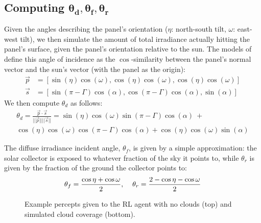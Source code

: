 \documentclass{article}
\begin{document}
\subsection{Computing $\pmb{\theta_d, \theta_f, \theta_r}$}
Given the angles describing the panel's orientation ($\eta$: north-south tilt, $\omega$: east-west tilt), we then simulate the amount of total irradiance actually hitting the panel's surface, given the panel's orientation relative to the sun. The models of~\citet{masters2013renewable} define this angle of incidence as the $\cos$-similarity between the panel's normal vector and the sun's vector (with the panel as the origin):
\begin{align*}
\vec{p} &= \left[ \sin(\eta)  \cos(\omega), \cos(\eta)  \cos(\omega), \cos(\eta) \cos(\omega) \right] \\
\vec{s} &= \left[ \sin(\pi - \Gamma)  \cos(\alpha), \cos(\pi - \Gamma)  \cos(\alpha), \sin(\alpha) \right]
\end{align*}
We then compute $\theta_d$ as follows:
\begin{multline}
\theta_d = \frac{\vec{p} \cdot \vec{s}}{||\vec{p}|| ||\vec{s} ||} = \sin(\eta)  \cos(\omega)  \sin(\pi - \Gamma)  \cos(\alpha)\ + \\
\cos(\eta)  \cos(\omega)  \cos(\pi - \Gamma)  \cos(\alpha) +  \cos(\eta) \cos(\omega)  \sin(\alpha) 
\end{multline}

The diffuse irradiance incident angle, $\theta_f$, is given by a simple approximation: the solar collector is exposed to whatever fraction of the sky it points to, while $\theta_r$ is given by the fraction of the ground the collector points to:
\begin{equation}
\theta_f = \frac{\cos \eta + \cos \omega}{2}, \hspace{4mm} \theta_r = \frac{2 - \cos\eta - \cos \omega}{2}
\end{equation}

\begin{figure}[t]
\begin{center}
 \hspace{16mm} %
\caption{Example percepts given to the RL agent with no clouds (top) and simulated cloud coverage (bottom).}
\end{center}
\end{figure}
\end{document}
